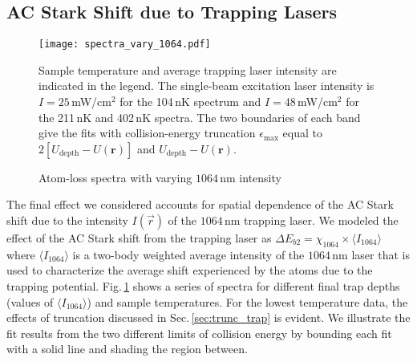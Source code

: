 \subsection{AC Stark Shift due to Trapping Lasers}
	\begin{figure}
	 \centerline{
	 \texttt{[image: spectra\_vary\_1064.pdf]}}
  \caption{Atom-loss spectra with varying $1064$\,nm intensity}{Sample temperature and average trapping laser intensity are indicated in the legend. The single-beam excitation laser intensity is $I=25$\,mW/cm$^{2}$ for the 104\,nK spectrum and $I=48$\,mW/cm$^{2}$ for the 211\,nK and 402\,nK spectra. The two boundaries of each band give the fits with collision-energy truncation
$\epsilon_{\text{max}}$ equal to $2[U_{\text{depth}}-U(\mathbf{r})]$ and $U_{\text{depth}}-U(\mathbf{r})$.}
  	\label{fig:Spectraminus9MHzVaryTrapCold}
	\end{figure}
The final effect we considered accounts for spatial dependence of the AC Stark shift due to the intensity $I(\vec{r})$ of the $1064$\,nm trapping laser.
We modeled the effect of the AC Stark shift from the trapping laser as $\Delta E_{b2} = \chi_{1064} \times \langle I_{1064} \rangle$ where $\langle I_{1064} \rangle $ is a two-body weighted average intensity of the $1064$\,nm laser that is used to characterize the average shift experienced by the atoms due to the trapping potential.
Fig.\,\ref{fig:Spectraminus9MHzVaryTrapCold} shows a series of spectra for different final trap depths (values of $\langle I_{1064} \rangle $) and sample temperatures.
For the lowest temperature data, the effects of truncation discussed in Sec.\,\ref{sec:trunc_trap} is evident.
We illustrate the fit results from the two different limits of collision energy by bounding each fit with a solid line and shading the region between.


